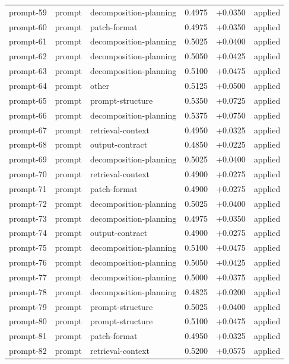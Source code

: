 \begin{center}
\begin{longtable}{llp{5.2cm}rrl}
prompt-59 & prompt & decomposition-planning & 0.4975 & +0.0350 & applied \\
prompt-60 & prompt & patch-format & 0.4975 & +0.0350 & applied \\
prompt-61 & prompt & decomposition-planning & 0.5025 & +0.0400 & applied \\
prompt-62 & prompt & decomposition-planning & 0.5050 & +0.0425 & applied \\
prompt-63 & prompt & decomposition-planning & 0.5100 & +0.0475 & applied \\
prompt-64 & prompt & other & 0.5125 & +0.0500 & applied \\
prompt-65 & prompt & prompt-structure & 0.5350 & +0.0725 & applied \\
prompt-66 & prompt & decomposition-planning & 0.5375 & +0.0750 & applied \\
prompt-67 & prompt & retrieval-context & 0.4950 & +0.0325 & applied \\
prompt-68 & prompt & output-contract & 0.4850 & +0.0225 & applied \\
prompt-69 & prompt & decomposition-planning & 0.5025 & +0.0400 & applied \\
prompt-70 & prompt & retrieval-context & 0.4900 & +0.0275 & applied \\
prompt-71 & prompt & patch-format & 0.4900 & +0.0275 & applied \\
prompt-72 & prompt & decomposition-planning & 0.5025 & +0.0400 & applied \\
prompt-73 & prompt & decomposition-planning & 0.4975 & +0.0350 & applied \\
prompt-74 & prompt & output-contract & 0.4900 & +0.0275 & applied \\
prompt-75 & prompt & decomposition-planning & 0.5100 & +0.0475 & applied \\
prompt-76 & prompt & decomposition-planning & 0.5050 & +0.0425 & applied \\
prompt-77 & prompt & decomposition-planning & 0.5000 & +0.0375 & applied \\
prompt-78 & prompt & decomposition-planning & 0.4825 & +0.0200 & applied \\
prompt-79 & prompt & prompt-structure & 0.5025 & +0.0400 & applied \\
prompt-80 & prompt & prompt-structure & 0.5100 & +0.0475 & applied \\
prompt-81 & prompt & patch-format & 0.4950 & +0.0325 & applied \\
prompt-82 & prompt & retrieval-context & 0.5200 & +0.0575 & applied \\

\end{longtable}
\end{center}
